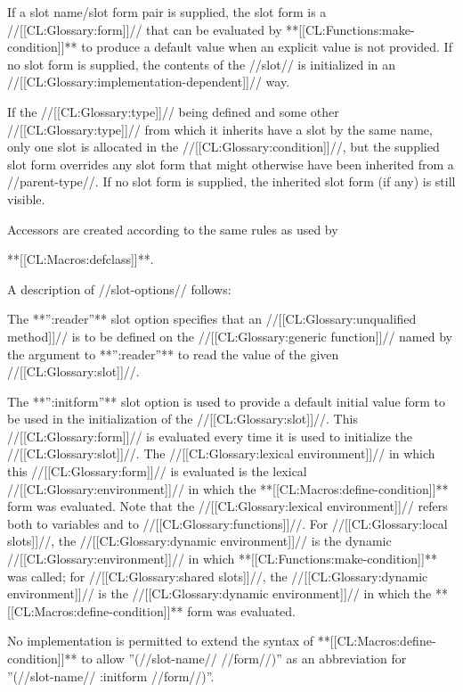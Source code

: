 If a slot name/slot form pair is supplied, the slot form is a //[[CL:Glossary:form]]// that can be evaluated by **[[CL:Functions:make-condition]]** to produce a default value when an explicit value is not provided. If no slot form is supplied, the contents of the //slot// is initialized in an //[[CL:Glossary:implementation-dependent]]// way.

If the //[[CL:Glossary:type]]// being defined and some other //[[CL:Glossary:type]]// from which it inherits have a slot by the same name, only one slot is allocated in the //[[CL:Glossary:condition]]//, but the supplied slot form overrides any slot form that might otherwise have been inherited from a //parent-type//. If no slot form is supplied, the inherited slot form (if any) is still visible.

Accessors are created according to the same rules as used by

**[[CL:Macros:defclass]]**.

A description of //slot-options// follows:

\beginlist


The **'':reader''** slot option specifies that an //[[CL:Glossary:unqualified method]]// is to be defined on the //[[CL:Glossary:generic function]]// named by the argument to **'':reader''** to read the value of the given //[[CL:Glossary:slot]]//.


\itemitem{\bull} The **'':initform''** slot option is used to provide a default initial value form to be used in the initialization of the //[[CL:Glossary:slot]]//. This //[[CL:Glossary:form]]// is evaluated every time it is used to initialize the //[[CL:Glossary:slot]]//. The //[[CL:Glossary:lexical environment]]// in which this //[[CL:Glossary:form]]// is evaluated is the lexical //[[CL:Glossary:environment]]// in which the **[[CL:Macros:define-condition]]** form was evaluated. Note that the //[[CL:Glossary:lexical environment]]// refers both to variables and to //[[CL:Glossary:functions]]//. For //[[CL:Glossary:local slots]]//, the //[[CL:Glossary:dynamic environment]]// is the dynamic //[[CL:Glossary:environment]]// in which **[[CL:Functions:make-condition]]** was called; for //[[CL:Glossary:shared slots]]//, the //[[CL:Glossary:dynamic environment]]// is the //[[CL:Glossary:dynamic environment]]// in which the **[[CL:Macros:define-condition]]** form was evaluated.


 No implementation is permitted to extend the syntax of **[[CL:Macros:define-condition]]** to allow ''(//slot-name// //form//)'' as an abbreviation for ''(//slot-name// :initform //form//)''.


